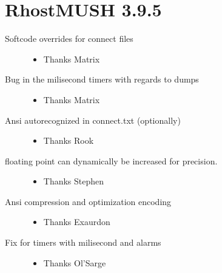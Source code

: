 \documentclass[letterpaper,10pt,english]{sphinxmanual}
\begin{document}
\section{RhostMUSH 3.9.5}
\label{\detokenize{changelog:rhostmush-3-9-5}}\label{\detokenize{changelog:changelog-3-9-5}}\begin{description}
\item[{Softcode overrides for connect files}] \leavevmode\begin{itemize}
\item {} 
\sphinxAtStartPar
Thanks Matrix

\end{itemize}

\item[{Bug in the milisecond timers with regards to dumps}] \leavevmode\begin{itemize}
\item {} 
\sphinxAtStartPar
Thanks Matrix

\end{itemize}

\item[{Ansi auto\sphinxhyphen{}recognized in connect.txt (optionally)}] \leavevmode\begin{itemize}
\item {} 
\sphinxAtStartPar
Thanks Rook

\end{itemize}

\item[{floating point can dynamically be increased for precision.}] \leavevmode\begin{itemize}
\item {} 
\sphinxAtStartPar
Thanks Stephen

\end{itemize}

\item[{Ansi compression and optimization encoding}] \leavevmode\begin{itemize}
\item {} 
\sphinxAtStartPar
Thanks Exaurdon

\end{itemize}

\item[{Fix for timers with milisecond and alarms}] \leavevmode\begin{itemize}
\item {} 
\sphinxAtStartPar
Thanks Ol’Sarge

\end{itemize}


\end{description}
\end{document}
